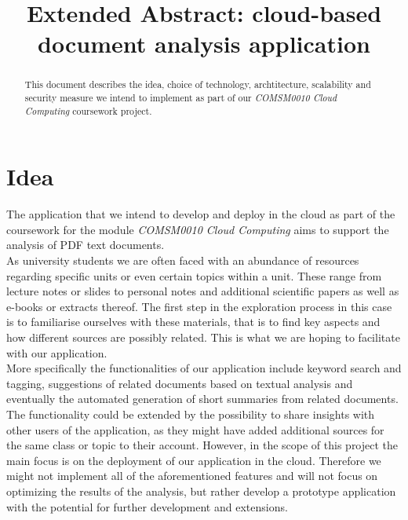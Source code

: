 \documentclass[conference]{IEEEtran}
\begin{document}
\title{Extended Abstract: cloud-based document analysis application}

\author{
\and
{}
}

\maketitle

\begin{abstract}
This document describes the idea, choice of technology, archtitecture, scalability and security measure
we intend to implement as part of our \textit{COMSM0010 Cloud Computing} coursework project.
\end{abstract}

\section{Idea}
The application that we intend to develop and deploy in the cloud as part of the coursework for the module 
\textit{COMSM0010 Cloud Computing} aims to support the analysis of PDF text documents. \\

As university students we are often faced with an abundance of resources regarding specific units or even
certain topics within a unit. These range from lecture notes or slides to personal notes and additional
scientific papers as well as e-books or extracts thereof. The first step in the exploration process in this
case is to familiarise ourselves with these materials, that is to find key aspects and how different sources
are possibly related. This is what we are hoping to facilitate with our application. \\

More specifically the functionalities of our application include keyword search and tagging, suggestions of
related documents based on textual analysis and eventually the automated generation of short summaries from
related documents. The functionality could be extended by the possibility to share insights with other users
of the application, as they might have added additional sources for the same class or topic to their account.
However, in the scope of this project the main focus is on the deployment of our application in the cloud.
Therefore we might not implement all of the aforementioned features and will not focus on optimizing the 
results of the analysis, but rather develop a prototype application with the potential for further 
development and extensions. \\
\end{document}

